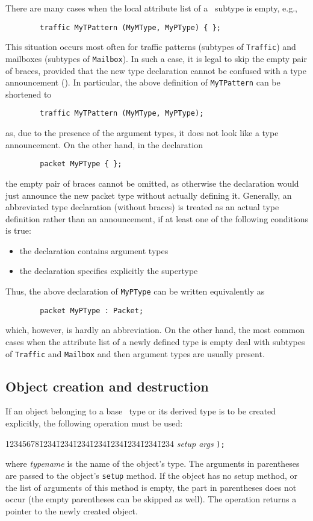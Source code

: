 There are many cases when the local attribute list of a \smurph\ subtype
is empty, e.g.,
\begin{verbatim}
        traffic MyTPattern (MyMType, MyPType) { };
\end{verbatim}
This situation occurs most often for traffic patterns (subtypes of
{\tt Traffic}) and mailboxes (subtypes of {\tt Mailbox}).
In such a case, it is legal to skip the empty pair of braces, provided that
the new type declaration cannot be confused with a type
announcement ().
In particular, the above definition of {\tt MyTPattern} can be shortened to
\begin{verbatim}
        traffic MyTPattern (MyMType, MyPType);
\end{verbatim}
as, due to the presence of the argument types, it does not look like a type
announcement.
On the other hand, in the declaration
\begin{verbatim}
        packet MyPType { };
\end{verbatim}
the empty pair of braces cannot be omitted, as otherwise the declaration would
just announce the new packet type without actually defining it.
Generally, an abbreviated type declaration (without braces) is treated as
an actual type definition rather than an announcement, if at least one of
the following conditions is true:
\begin{itemize}
\item
the declaration contains argument types
\item
the declaration specifies explicitly the supertype
\end{itemize}
Thus, the above declaration of {\tt MyPType} can be written equivalently as
\begin{verbatim}
        packet MyPType : Packet;
\end{verbatim}
which, however, is hardly an abbreviation.
On the other hand, the most common cases when the attribute list of a newly
defined type is empty deal with subtypes of {\tt Traffic} and {\tt Mailbox}
and then argument types are usually present.

\subsection{Object creation and destruction}
\label{rm_st_oc}

If an object belonging to a base \smurph\ type or its derived type
is to be created explicitly,
the following operation must be used:
{\tt\begin{tabbing}
12345678\=1234\=1234\=1234\=1234\=1234\=1234\=1234\=1234\kill
{} {\em setup args\/} {\tt );} \\
\end{tabbing}}
\noindent
where {\em typename\/} is the name of the object's type.
The arguments in parentheses are passed to the object's
{\tt setup} method.
If the object has no setup method, or the list of arguments of this method is
empty, the part in parentheses does not occur (the empty parentheses can be
skipped as well).
The operation returns a pointer to the newly created object.

